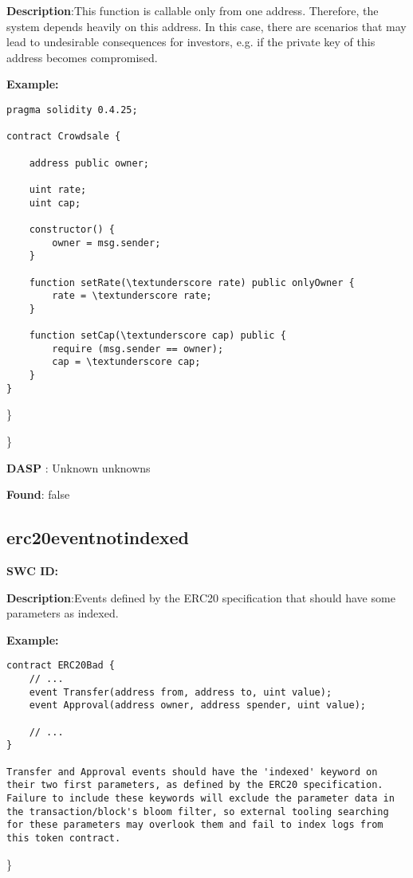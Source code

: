 \documentclass{article}
\begin{document}
\textbf{Description}:This function is callable only from one address. Therefore, the system depends heavily on this address. In this case, there are scenarios that may lead to undesirable consequences for investors, e.g. if the private key of this address becomes compromised.


\textbf{Example:} 
\begin{verbatim}
pragma solidity 0.4.25;

contract Crowdsale {

    address public owner;

    uint rate;
    uint cap;

    constructor() {
        owner = msg.sender;
    }

    function setRate(\textunderscore rate) public onlyOwner {
        rate = \textunderscore rate;
    }

    function setCap(\textunderscore cap) public {
        require (msg.sender == owner);
        cap = \textunderscore cap;
    }
}

\end{verbatim}\} 

\} 

\textbf{DASP} : Unknown unknowns

\textbf{Found}: false

\subsection{erc20\textunderscore event\textunderscore not\textunderscore indexed} 
\textbf{SWC \textunderscore ID:} 

\textbf{Description}:Events defined by the ERC20 specification that should have some parameters as indexed.


\textbf{Example:} 
\begin{verbatim}
contract ERC20Bad {
    // ...
    event Transfer(address from, address to, uint value);
    event Approval(address owner, address spender, uint value);

    // ...
}

Transfer and Approval events should have the 'indexed' keyword on their two first parameters, as defined by the ERC20 specification. Failure to include these keywords will exclude the parameter data in the transaction/block's bloom filter, so external tooling searching for these parameters may overlook them and fail to index logs from this token contract.

\end{verbatim}\} 
\end{document}
